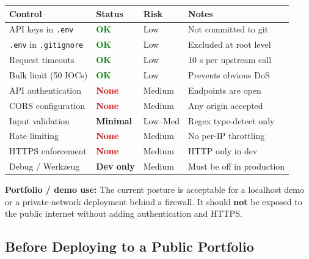 \documentclass[11pt,a4paper]{article}
\begin{document}
\begin{center}
\begin{tabular}{llll}
\toprule
\textbf{Control} & \textbf{Status} & \textbf{Risk} & \textbf{Notes} \\
\midrule
API keys in \texttt{.env} & \textcolor{green}{\textbf{OK}} & Low & Not committed to git \\
\texttt{.env} in \texttt{.gitignore} & \textcolor{green}{\textbf{OK}} & Low & Excluded at root level \\
Request timeouts & \textcolor{green}{\textbf{OK}} & Low & 10 s per upstream call \\
Bulk limit (50 IOCs) & \textcolor{green}{\textbf{OK}} & Low & Prevents obvious DoS \\
\midrule
API authentication & \textcolor{red}{\textbf{None}} & Medium & Endpoints are open \\
CORS configuration & \textcolor{red}{\textbf{None}} & Medium & Any origin accepted \\
Input validation & \textcolor{amber}{\textbf{Minimal}} & Low--Med & Regex type-detect only \\
Rate limiting & \textcolor{red}{\textbf{None}} & Medium & No per-IP throttling \\
HTTPS enforcement & \textcolor{red}{\textbf{None}} & Medium & HTTP only in dev \\
Debug / Werkzeug & \textcolor{amber}{\textbf{Dev only}} & Medium & Must be off in production \\
\bottomrule
\end{tabular}
\end{center}

\begin{amberbox}
\textbf{Portfolio / demo use:} The current posture is acceptable for a localhost demo or a private-network deployment behind a firewall. It should \textbf{not} be exposed to the public internet without adding authentication and HTTPS.
\end{amberbox}

\subsection{Before Deploying to a Public Portfolio}
\end{document}
